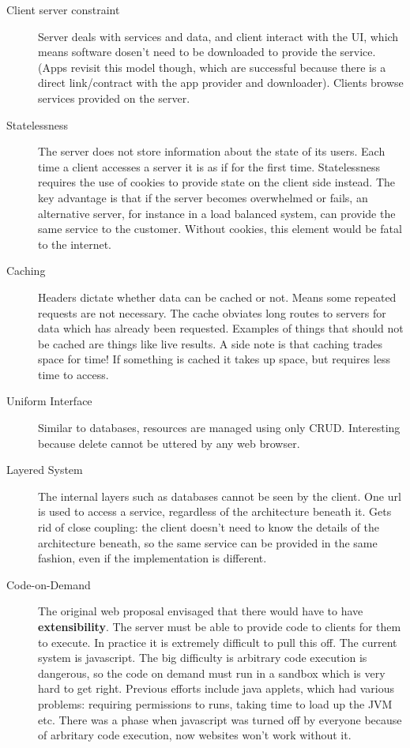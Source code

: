 \documentclass[11pt]{article}
\begin{document}
\begin{description}
  \item[Client server constraint]
  Server deals with services and data, and client interact with the UI, which means software dosen't need to be downloaded to provide the service. (Apps revisit this model though, which are successful because there is a direct link/contract with the app provider and downloader). Clients browse services provided on the server.
  \item[Statelessness]
  The server does not store information about the state of its users. Each time a client accesses a server it is as if for the first time. Statelessness requires the use of cookies to provide state on the client side instead. The key advantage is that if the server becomes overwhelmed or fails, an alternative server, for instance in a load balanced system, can provide the same service to the customer. Without cookies, this element would be fatal to the internet.
  \item[Caching]
  Headers dictate whether data can be cached or not. Means some repeated requests are not necessary. The cache obviates long routes to servers for data which has already been requested. Examples of things that should not be cached are things like live results. A side note is that caching trades space for time! If something is cached it takes up space, but requires less time to access.
  \item[Uniform Interface]
  Similar to databases, resources are managed using only CRUD. Interesting because delete cannot be uttered by any web browser.
  \item[Layered System]
  The internal layers such as databases cannot be seen by the client. One url is used to access a service, regardless of the architecture beneath it. Gets rid of close coupling: the client doesn't need to know the details of the architecture beneath, so the same service can be provided in the same fashion, even if the implementation is different.
  \item[Code-on-Demand]
  The original web proposal envisaged that there would have to have \textbf{extensibility}. The server must be able to provide code to clients for them to execute. In practice it is extremely difficult to pull this off. The current system is javascript. The big difficulty is arbitrary code execution is dangerous, so the code on demand must run in a sandbox which is very hard to get right. Previous efforts include java applets, which had various problems: requiring permissions to runs, taking time to load up the JVM etc. There was a phase when javascript was turned off by everyone because of arbritary code execution, now websites won't work without it.
\end{description}
\end{document}
